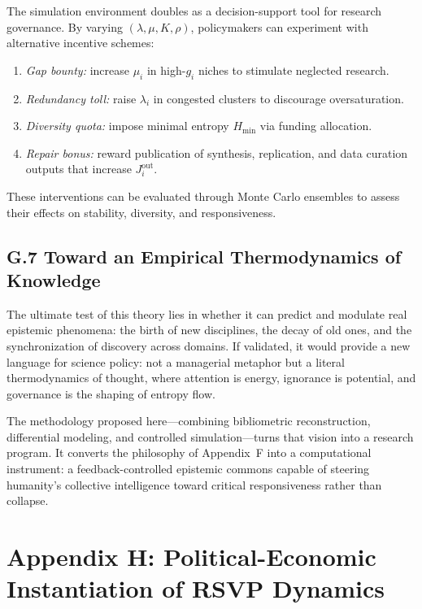 \documentclass[11pt,a4paper,titlepage]{article}
\theoremstyle{definition}
\begin{document}
\begin{itemize}
The simulation environment doubles as a decision-support tool for research governance.
By varying $(\lambda,\mu,K,\rho)$, policymakers can experiment with alternative incentive schemes:

\begin{enumerate}
\item \emph{Gap bounty:} increase $\mu_i$ in high-$g_i$ niches to stimulate neglected research.
\item \emph{Redundancy toll:} raise $\lambda_i$ in congested clusters to discourage oversaturation.
\item \emph{Diversity quota:} impose minimal entropy $H_{\min}$ via funding allocation.
\item \emph{Repair bonus:} reward publication of synthesis, replication, and data curation outputs that increase $J^{\mathrm{out}}_i$.
\end{enumerate}

These interventions can be evaluated through Monte Carlo ensembles to assess their effects on stability, diversity, and responsiveness.

\subsection*{G.7 Toward an Empirical Thermodynamics of Knowledge}

The ultimate test of this theory lies in whether it can predict and modulate real epistemic phenomena:
the birth of new disciplines, the decay of old ones, and the synchronization of discovery across domains.
If validated, it would provide a new language for science policy:
not a managerial metaphor but a literal thermodynamics of thought,
where attention is energy, ignorance is potential, and governance is the shaping of entropy flow.

The methodology proposed here—combining bibliometric reconstruction, differential modeling, and controlled simulation—turns that vision into a research program.
It converts the philosophy of Appendix~F into a computational instrument:
a feedback-controlled epistemic commons capable of steering humanity’s collective intelligence toward critical responsiveness rather than collapse.

\section*{Appendix H: Political-Economic Instantiation of RSVP Dynamics}
\label{app:political_economic}


\end{itemize}
\end{document}
